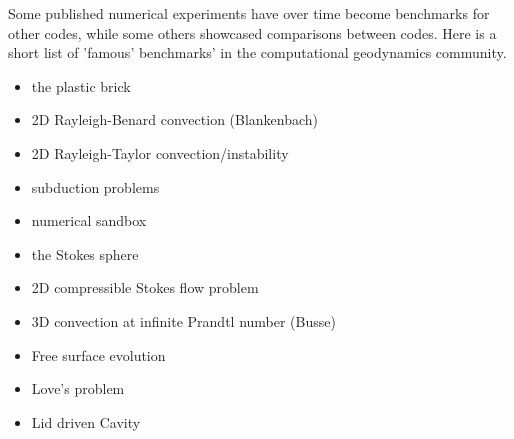 Some published numerical experiments have over time become benchmarks for other codes, while some 
others showcased comparisons between codes. Here is a short list of 'famous' benchmarks' in the 
computational geodynamics community.

\begin{itemize}
\item the plastic brick \cite{lemm08,kaus10,qurj09}
\item 2D Rayleigh-Benard convection (Blankenbach)  \cite{blbc89,trha98,chhl08,king09,lezh11,vyrc13,trab90}
\item 2D Rayleigh-Taylor convection/instability \cite{pros81,trab90,soga01,bast02,taki03,bomh06, basd08,qurj09,saev10,lezh11,vyrc13,vkks97,bomh06} 
\item subduction problems \cite{scbe08,vack08}
\item numerical sandbox \cite{bbeg06,busa16}
\item the Stokes sphere \cite{galemanual}
\item 2D compressible Stokes flow problem \cite{lezh08}
\item 3D convection at infinite Prandtl number (Busse) \cite{bucc93,trha98}
\item Free surface evolution \cite{crsg12}
\item Love's problem \cite{bebe04}
\item Lid driven Cavity \cite{bope98}
\end{itemize}

